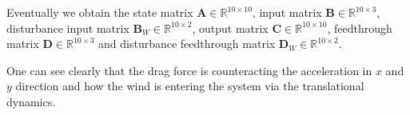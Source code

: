 Eventually we obtain the state matrix $\mathbf{A} \in \mathbb{R}^{10\times10}$, input matrix $\mathbf{B} \in \mathbb{R}^{10\times3}$, disturbance input matrix $\mathbf{B}_W \in \mathbb{R}^{10\times2}$, output matrix $\mathbf{C} \in \mathbb{R}^{10\times10}$,  feedthrough matrix $\mathbf{D} \in \mathbb{R}^{10\times3}$ and disturbance feedthrough matrix  $\mathbf{D}_W \in \mathbb{R}^{10\times2}$. 

One can see clearly that the drag force is counteracting the acceleration in $x$ and $y$ direction and how the wind is entering the system via the translational dynamics.
